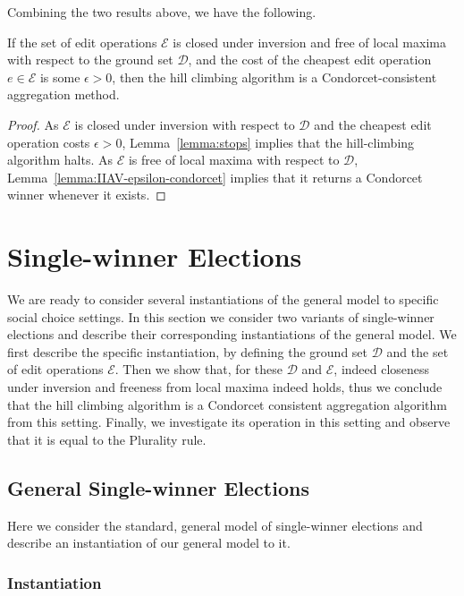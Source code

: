 \documentclass[sigconf]{aamas}  %
\newcommand{\calD}{\mathcal{D}}
\newcommand{\calE}{\mathcal{E}}
\begin{document}
Combining the two results above, we have the following.

\begin{corollary}\label{corollary:main}
If the set of edit operations $\calE$ is closed under inversion and free of local maxima with respect to the ground set $\calD$,
and the cost of the cheapest edit operation $e \in \calE$ is some $\epsilon > 0$,
then the hill climbing algorithm is a Condorcet-consistent aggregation method.
\end{corollary}

\begin{proof}
%
As $\calE$ is closed under inversion with respect to $\calD$ and the cheapest edit operation costs $\epsilon > 0$,
Lemma~\ref{lemma:stops} implies that the hill-climbing algorithm halts.
As $\calE$ is free of local maxima with respect to $\calD$,
Lemma~\ref{lemma:IIAV-epsilon-condorcet} implies that it returns a Condorcet winner whenever it exists.
%
\end{proof}


\section{Single-winner Elections}

We are ready to consider several instantiations of the general model to specific social choice settings.
In this section we consider two variants of single-winner elections and describe their corresponding instantiations of the general model.
We first describe the specific instantiation,
by defining the ground set $\calD$ and the set of edit operations $\calE$.
Then we show that, for these $\calD$ and $\calE$,
indeed closeness under inversion and freeness from local maxima indeed holds,
thus we conclude that the hill climbing algorithm is a Condorcet consistent aggregation algorithm from this setting.
Finally, we investigate its operation in this setting and observe that it is equal to the Plurality rule.


\subsection{General Single-winner Elections}

Here we consider the standard, general model of single-winner elections and describe an instantiation of our general model to it.


\subsubsection{Instantiation}
\end{document}
